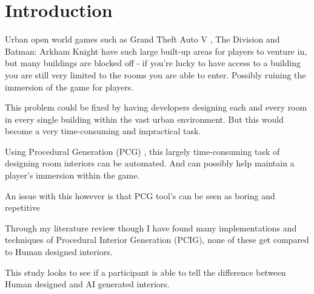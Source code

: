 \section{Introduction}

Urban open world games such as Grand Theft Auto V \cite{game:gta}, The Division \cite{game:division} and Batman: Arkham Knight \cite{game:arkham-knight}
have such large built-up areas for players to venture in, but many buildings are blocked off - 
if you're lucky to have access to a building you are still very limited to the rooms you are able to enter.
Possibly ruining the immersion of the game for players.

This problem could be fixed by having developers designing each and every room in every single building within the vast urban environment.
But this would become a very time-consuming and impractical task.

Using Procedural Generation (PCG) \cite{what-is-pcg}, this largely time-consuming task of designing room interiors can be automated. And can possibly help maintain a player's immersion within the game.

An issue with this however is that PCG tool's can be seen as boring and repetitive \cite{pcg_in_gd} 

Through my literature review though I have found many implementations and techniques of Procedural Interior Generation (PCIG), none of these get compared to Human designed interiors. 

This study looks to see if a participant is able to tell the difference between Human designed and AI generated interiors.

